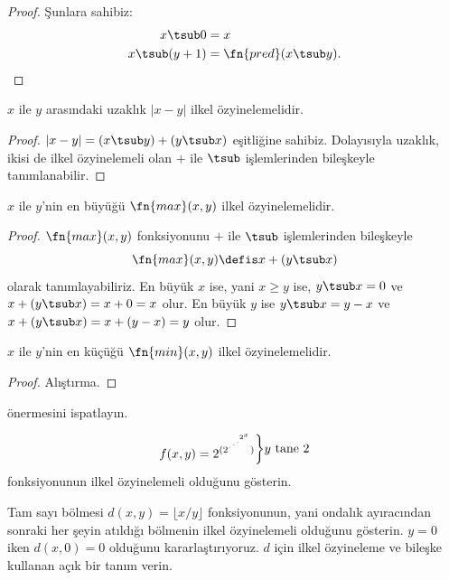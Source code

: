 \begin{proof}
  Şunlara sahibiz:
  \begin{align*}
    x\tsub0 & = x\\
    x\tsub(y+1) & = \fn{pred}(x\tsub y).
  \end{align*}
\end{proof}

\begin{prop}
  $x$ ile $y$ arasındaki uzaklık $\lvert x-y\rvert$ ilkel özyinelemelidir.
\end{prop}

\begin{proof}
  $\lvert x-y\rvert=(x\tsub y)+(y\tsub x)$ eşitliğine sahibiz. Dolayısıyla
  uzaklık, ikisi de ilkel özyinelemeli olan $+$ ile $\tsub$ işlemlerinden
  bileşkeyle tanımlanabilir.
\end{proof}

\begin{prop}
  $x$ ile $y$'nin en büyüğü $\fn{max}(x,y)$ ilkel özyinelemelidir.
\end{prop}

\begin{proof}
  $\fn{max}(x,y)$ fonksiyonunu $+$ ile $\tsub$ işlemlerinden bileşkeyle
  \[
    \fn{max}(x,y)\defis x+(y\tsub x)
  \]
  olarak tanımlayabiliriz. En büyük $x$ ise, yani $x\geq y$ ise,
  $y\tsub x=0$ ve $x+(y\tsub x)=x+0=x$ olur. En büyük $y$ ise
  $y\tsub x=y-x$ ve $x+(y\tsub x)=x+(y-x)=y$ olur.
\end{proof}

\begin{prop}
  $x$ ile $y$'nin en küçüğü $\fn{min}(x,y)$ ilkel özyinelemelidir.
\end{prop}

\begin{proof}
  Alıştırma.
\end{proof}

\begin{prob}
   önermesini ispatlayın.
\end{prob}

\begin{prob}
\[
  f(x,y)=2^{(2^{\iddots^{2^x}})}
  \raisebox{1ex}{\bigg\rbrace}
  \raisebox{1ex}{\text{$y$ tane $2$}}
\]
fonksiyonunun ilkel özyinelemeli olduğunu gösterin.
\end{prob}

\begin{prob}
Tam sayı bölmesi $d(x,y)=\lfloor x/y\rfloor$ fonksiyonunun, yani ondalık
ayıracından sonraki her şeyin atıldığı bölmenin ilkel özyinelemeli olduğunu
gösterin. $y=0$ iken $d(x,0)=0$ olduğunu kararlaştırıyoruz. $d$ için ilkel
özyineleme ve bileşke kullanan açık bir tanım verin.
\end{prob}

